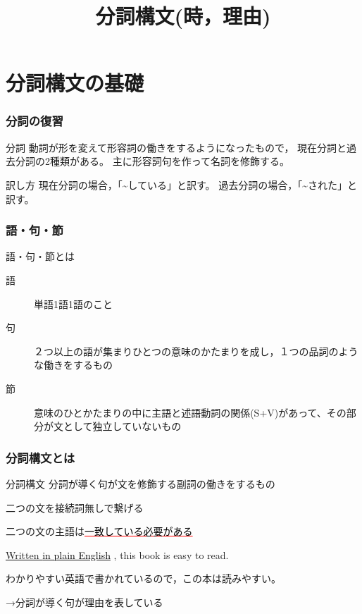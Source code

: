 \documentclass[xcolor=dvipsnames,unicode,14pt]{beamer}%
\title{分詞構文(時，理由)}
\begin{document}
\frame{\maketitle}

\begin{frame}
  \tableofcontents
\end{frame}
\section{分詞構文の基礎}
\begin{frame}
  \frametitle{分詞の復習}
  \begin{block}{分詞}
    動詞が形を変えて形容詞の働きをするようになったもので，
    現在分詞と過去分詞の2種類がある。
    主に形容詞句を作って名詞を修飾する。
  \end{block}
  \begin{block}{訳し方}
    現在分詞の場合，「\textasciitilde している」と訳す。
    過去分詞の場合，「\textasciitilde された」と訳す。
  \end{block}
\end{frame}

\begin{frame}
  \frametitle{語・句・節}
  語・句・節とは
  \pause
  \begin{description}
    \item[語] 単語1語1語のこと
    \item[句] ２つ以上の語が集まりひとつの意味のかたまりを成し，１つの品詞のような働きをするもの
    \item[節] 意味のひとかたまりの中に主語と述語動詞の関係(S+V)があって、その部分が文として独立していないもの
  \end{description}
  \pause

\end{frame}
\begin{frame}
  \frametitle{分詞構文とは}

  \begin{block}{分詞構文}
    分詞が導く句が文を修飾する副詞の働きをするもの

    二つの文を接続詞無しで繋げる

    二つの文の主語は\textcolor{Red}{\underline{\textcolor{black}{一致している必要がある}}}
  \end{block} 
  \textcolor{NavyBlue}{\underline{Written \textcolor{black}{in plain English}}} , this book is easy to read. 

  わかりやすい英語で書かれているので，この本は読みやすい。

  →分詞が導く句が理由を表している

\end{frame}
\end{document}
